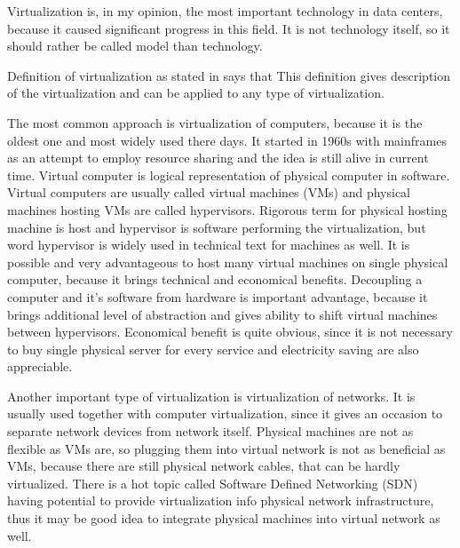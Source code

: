 
Virtualization is, in my opinion, the most important technology in data centers, because it caused significant progress in this field. It is not technology itself, so it should rather be called model than technology.

Definition of virtualization as stated in \cite{virtualization-in-education} says that  This definition gives description of the virtualization and can be applied to any type of virtualization.

The most common approach is virtualization of computers, because it is the oldest one and most widely used there days. It started in 1960s with mainframes as an attempt to employ resource sharing and the idea is still alive in current time. Virtual computer is logical representation of physical computer in software. \cite{virtualization-in-education} Virtual computers are usually called virtual machines (\Ac{VM}s) and physical machines hosting \Ac{VM}s are called hypervisors. Rigorous term for physical hosting machine is host and hypervisor is software performing the virtualization, but word hypervisor is widely used in technical text for machines as well. It is possible and very advantageous to host many virtual machines on single physical computer, because it brings technical and economical benefits. Decoupling a computer and it's software from hardware is important advantage, because it brings additional level of abstraction and gives ability to shift virtual machines between hypervisors. Economical benefit is quite obvious, since it is not necessary to buy single physical server for every service and electricity saving are also appreciable.

Another important type of virtualization is virtualization of networks. It is usually used together with computer virtualization, since it gives an occasion to separate network devices from network itself. Physical machines are not as flexible as \Ac{VM}s are, so plugging them into virtual network is not as beneficial as \Ac{VM}s, because there are still physical network cables, that can be hardly virtualized. There is a hot topic called Software Defined Networking (\Ac{SDN}) having potential to provide virtualization info physical network infrastructure, thus it may be good idea to integrate physical machines into virtual network as well.

